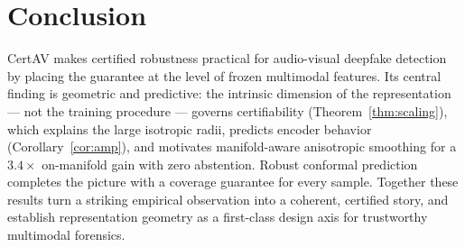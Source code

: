 \section{Conclusion}
\label{sec:conclusion}

CertAV makes certified robustness practical for audio-visual deepfake detection by placing the guarantee at the level of frozen multimodal features. Its central finding is geometric and predictive: the intrinsic dimension of the representation --- not the training procedure --- governs certifiability (Theorem~\ref{thm:scaling}), which explains the large isotropic radii, predicts encoder behavior (Corollary~\ref{cor:amp}), and motivates manifold-aware anisotropic smoothing for a $3.4\times$ on-manifold gain with zero abstention. Robust conformal prediction completes the picture with a coverage guarantee for every sample. Together these results turn a striking empirical observation into a coherent, certified story, and establish representation geometry as a first-class design axis for trustworthy multimodal forensics.
